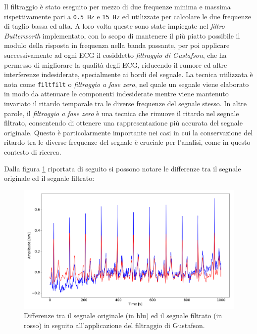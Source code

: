 Il filtraggio è stato eseguito per mezzo di due frequenze minima e massima rispettivamente pari a \texttt{0.5 Hz} e \texttt{15 Hz} ed utilizzate per calcolare le due frequenze di taglio bassa ed alta. A loro volta queste sono state impiegate nel \textit{filtro Butterworth} implementato, con lo scopo di mantenere il più piatto possibile il modulo della risposta in frequenza nella banda passante, per poi applicare successivamente ad ogni ECG il cosiddetto \textit{filtraggio di Gustafson}, che ha permesso di migliorare la qualità degli ECG, riducendo il rumore ed altre interferenze indesiderate, specialmente ai bordi del segnale. La tecnica utilizzata è nota come \texttt{filtfilt} o \textit{filtraggio a fase zero}, nel quale un segnale viene elaborato in modo da attenuare le componenti indesiderate mentre viene mantenuto invariato il ritardo temporale tra le diverse frequenze del segnale stesso. In altre parole, il \textit{filtraggio a fase zero} è una tecnica che rimuove il ritardo nel segnale filtrato, consentendo di ottenere una rappresentazione più accurata del segnale originale. Questo è particolarmente importante nei casi in cui la conservazione del ritardo tra le diverse frequenze del segnale è cruciale per l'analisi, come in questo contesto di ricerca.

Dalla figura \ref{fig:filtraggio} riportata di seguito si possono notare le differenze tra il segnale originale ed il segnale filtrato:

\begin{figure}[H]
    \centering
    \includegraphics[width=1\textwidth]{immagini/filtraggio.png}
    \captionsetup{justification=centering}
    \caption{Differenze tra il segnale originale (in blu) ed il segnale filtrato (in rosso) in seguito all'applicazione del filtraggio di Gustafson.}
    \label{fig:filtraggio}
\end{figure}


